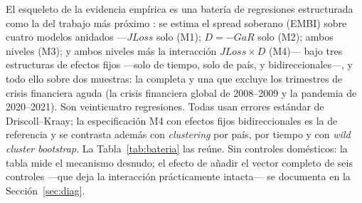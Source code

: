 El esqueleto de la evidencia empírica es una batería de regresiones estructurada como la del trabajo más próximo \citep{Chari2024b}: se estima el spread soberano (EMBI) sobre cuatro modelos anidados —$JLoss$ solo (M1); $D=-GaR$ solo (M2); ambos niveles (M3); y ambos niveles más la interacción $JLoss\times D$ (M4)— bajo tres estructuras de efectos fijos —solo de tiempo, solo de país, y bidireccionales—, y todo ello sobre dos muestras: la completa y una que excluye los trimestres de crisis financiera aguda (la crisis financiera global de 2008--2009 y la pandemia de 2020--2021). Son veinticuatro regresiones. Todas usan errores estándar de Driscoll–Kraay; la especificación M4 con efectos fijos bidireccionales es la de referencia y se contrasta además con \textit{clustering} por país, por tiempo y con \textit{wild cluster bootstrap}. La Tabla~\ref{tab:bateria} las reúne. Sin controles domésticos: la tabla mide el mecanismo desnudo; el efecto de añadir el vector completo de seis controles —que deja la interacción prácticamente intacta— se documenta en la Sección~\ref{sec:diag}.

